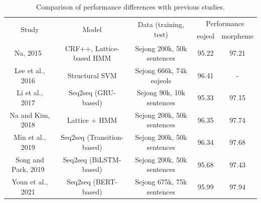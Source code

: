 \documentclass[AMS,STIX2COL]{WileyNJD-v2}
\begin{document}
    \begin{table}[ht]
        \caption{Comparison of performance differences with previous studies.}
        \label{tab:differences-with-previous-studies}
        \begin{tabular*}{500pt}{@{\extracolsep\fill}ccc|cc@{\extracolsep\fill}}
            \toprule
            \multirow{2}{*}{Study}                & \multirow{2}{*}{Model}                          & \multirow{2}{*}{Data (training, test)}      & \multicolumn{2}{c}{Performance}                           \\
            \cmidrule{4-5}
            ~                                     & ~                                               & ~                                           & \multicolumn{1}{c}{eojeol} & \multicolumn{1}{c}{morpheme} \\
            \midrule
            Na, 2015~\cite{NaSH2015}              & CRF++, Lattice-based HMM                        & Sejong 200k, 50k sentences                  & 95.22                      & 97.21                        \\
            Lee et al., 2016~\cite{LeeCH2016}     & Structural SVM                                  & Sejong 666k, 74k eojeols                    & 96.41                      & -                            \\
            Li et al., 2017~\cite{Li2017}         & Seq2seq (GRU-based)                             & Sejong 90k, 10k sentences                   & 95.33                      & 97.15                        \\
            Na and Kim, 2018~\cite{NaSH2018}      & Lattice + HMM                                   & Sejong 200k, 50k sentences                  & 96.35                      & 97.74                        \\
            Min et al., 2019~\cite{MinJW2019}     & Seq2seq (Transition-based)                      & Sejong 200k, 50k sentences                  & 96.34                      & 97.68                        \\
            Song and Park, 2019~\cite{SongHJ2019} & Seq2seq (BiLSTM-based)                          & Sejong 200k, 50k sentences                  & 95.68                      & 97.43                        \\
            Youn et al., 2021~\cite{YounJY2021}   & Seq2seq (BERT-based)                            & Sejong 675k, 75k sentences                  & 95.99                      & 97.94                        \\

\end{tabular*}
\end{table}
\end{document}
